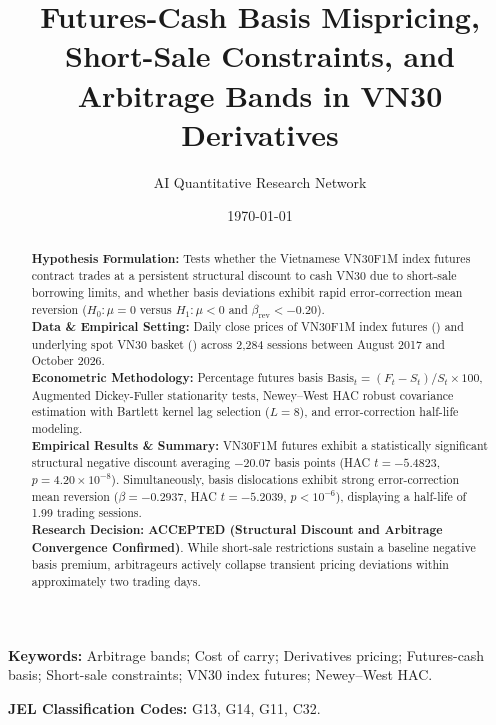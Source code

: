 \documentclass{article}
\title{\textbf{Futures-Cash Basis Mispricing, Short-Sale Constraints, and Arbitrage Bands in VN30 Derivatives}}
\author[1*]{AI Quantitative Research Network}
\affil[1]{Autonomous Financial Machine Learning \& Empirical Econometrics Lab, Ho Chi Minh City, Vietnam}
\affil[*]{Contact: \texttt{research@vnresearch.org}}
\date{\today}
\begin{document}
\maketitle

\begin{abstract}
\noindent \textbf{Hypothesis Formulation:} Tests whether the Vietnamese VN30F1M index futures contract trades at a persistent structural discount to cash VN30 due to short-sale borrowing limits, and whether basis deviations exhibit rapid error-correction mean reversion ($H_0: \mu = 0$ versus $H_1: \mu < 0$ and $\beta_{\text{rev}} < -0.20$). \\
\textbf{Data \& Empirical Setting:} Daily close prices of VN30F1M index futures () and underlying spot VN30 basket () across 2,284 sessions between August 2017 and October 2026. \\
\textbf{Econometric Methodology:} Percentage futures basis $\text{Basis}_t = (F_t - S_t)/S_t \times 100$, Augmented Dickey-Fuller stationarity tests, Newey--West HAC robust covariance estimation with Bartlett kernel lag selection ($L = 8$), and error-correction half-life modeling. \\
\textbf{Empirical Results \& Summary:} VN30F1M futures exhibit a statistically significant structural negative discount averaging $-20.07$ basis points (HAC $t = -5.4823$, $p = 4.20 \times 10^{-8}$). Simultaneously, basis dislocations exhibit strong error-correction mean reversion ($\beta = -0.2937$, HAC $t = -5.2039$, $p < 10^{-6}$), displaying a half-life of 1.99 trading sessions. \\
\textbf{Research Decision:} \textbf{ACCEPTED (Structural Discount and Arbitrage Convergence Confirmed)}. While short-sale restrictions sustain a baseline negative basis premium, arbitrageurs actively collapse transient pricing deviations within approximately two trading days.
\end{abstract}

\vspace{0.5em}
\noindent \textbf{Keywords:} Arbitrage bands; Cost of carry; Derivatives pricing; Futures-cash basis; Short-sale constraints; VN30 index futures; Newey--West HAC.

\vspace{0.5em}
\noindent \textbf{JEL Classification Codes:} G13, G14, G11, C32.

\newpage

\end{document}
